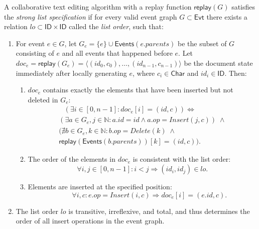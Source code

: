 \documentclass[sigplan,10pt]{acmart}
\begin{document}
\begin{definition}\label{strong-list-spec}
  A collaborative text editing algorithm with a replay function $\mathsf{replay}(G)$ satisfies the \emph{strong list specification} if for every valid event graph $G \subset \mathsf{Evt}$ there exists a relation $\mathit{lo} \subset \mathsf{ID} \times \mathsf{ID}$ called the \emph{list order}, such that:
  \begin{enumerate}
    \item For event $e \in G$, let $G_e = \{e\} \cup \mathsf{Events}(e.\mathit{parents})$ be the subset of $G$ consisting of $e$ and all events that happened before $e$.
    Let $\mathit{doc}_e = \mathsf{replay}(G_e) = \langle (\mathit{id}_0, c_0), \dots, (\mathit{id}_{n-1}, c_{n-1}) \rangle$ be the document state immediately after locally generating $e$, where $c_i \in \mathsf{Char}$ and $\mathit{id}_i \in \mathsf{ID}$. Then:
      \begin{enumerate}
        \item $\mathit{doc}_e$ contains exactly the elements that have been inserted but not deleted in $G_e$:
         \begin{multline*}
             \hspace{9pt}(\exists i \in [0, n-1]: \mathit{doc}_e [i] = (\mathit{id}, c)) \Longleftrightarrow \\
             (\exists a \in G_e, j \in \mathbb{N}: a.\mathit{id} = \mathit{id} \wedge a.\mathit{op} = \mathit{Insert}(j,c)) \;\wedge \\
             (\nexists b \in G_e, k \in \mathbb{N}: b.\mathit{op} = \mathit{Delete}(k) \;\wedge \\
             \mathsf{replay}(\mathsf{Events}(b.\mathit{parents}))[k] = (\mathit{id}, c)).
         \end{multline*}
        \item The order of the elements in $\mathit{doc}_e$ is consistent with the list order:
          \begin{equation*}
            \forall i, j \in [0, n-1]: i<j \Longrightarrow (\mathit{id}_i, \mathit{id}_j) \in \mathit{lo}.
          \end{equation*}
        \item Elements are inserted at the specified position:
          \begin{equation*}
            \qquad\forall i, c: e.\mathit{op} = \mathit{Insert}(i,c) \Longrightarrow \mathit{doc}_e [i] = (e.\mathit{id}, c).
          \end{equation*}
      \end{enumerate}
    \item The list order $\mathit{lo}$ is transitive, irreflexive, and total, and thus determines the order of all insert operations in the event graph.
  \end{enumerate}
\end{definition}
\end{document}
